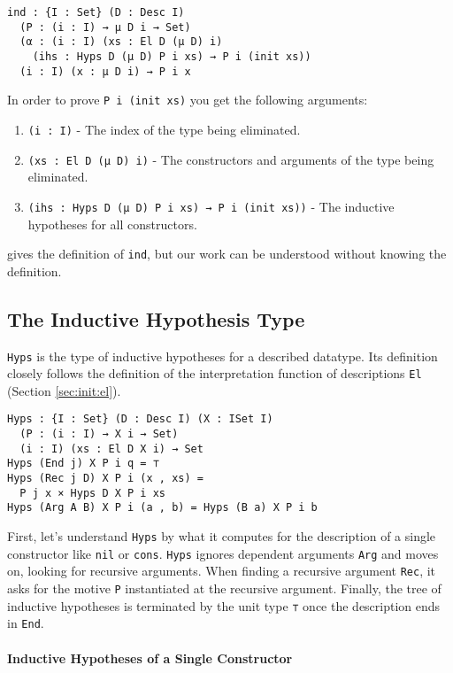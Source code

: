 \documentclass[preprint,nonatbib]{sigplanconf}
\newcommand{\refsec}[1]{Section \ref{sec:#1}}
\begin{document}
\begin{verbatim}
ind : {I : Set} (D : Desc I)
  (P : (i : I) → μ D i → Set)
  (α : (i : I) (xs : El D (μ D) i)
    (ihs : Hyps D (μ D) P i xs) → P i (init xs))
  (i : I) (x : μ D i) → P i x
\end{verbatim}

In order to prove {\tt P i (init xs)} you get the following
arguments:

\begin{enumerate}
\item{{\tt (i : I)}} - The index of the type being eliminated.
\item{{\tt (xs : El D (μ D) i)}} - The constructors and arguments of the type
  being eliminated.
\item{{\tt (ihs : Hyps D (μ D) P i xs) → P i (init xs))}} - The inductive
  hypotheses for all constructors.
\end{enumerate}

\citet{mcbride2010ornamental} gives the definition of {\tt ind}, but
our work can be understood without knowing the definition.

\subsection{The Inductive Hypothesis Type}

{\tt Hyps} is the type of inductive hypotheses for a described
datatype. Its definition closely follows the definition of
the interpretation function of descriptions {\tt El}
(\refsec{init:el}).

\begin{verbatim}
Hyps : {I : Set} (D : Desc I) (X : ISet I)
  (P : (i : I) → X i → Set)
  (i : I) (xs : El D X i) → Set
Hyps (End j) X P i q = ⊤
Hyps (Rec j D) X P i (x , xs) =
  P j x × Hyps D X P i xs
Hyps (Arg A B) X P i (a , b) = Hyps (B a) X P i b
\end{verbatim}

First, let's understand {\tt Hyps} by what it computes for the
description of a single constructor like {\tt nil} or {\tt cons}.
{\tt Hyps} ignores dependent arguments {\tt Arg} and moves on, looking
for recursive arguments. When finding a recursive argument {\tt Rec}, it
asks for the motive {\tt P} instantiated at the recursive argument.
Finally, the tree of inductive hypotheses is terminated by the unit
type {\tt ⊤} once the description ends in {\tt End}.

\paragraph{Inductive Hypotheses of a Single Constructor}
\end{document}
